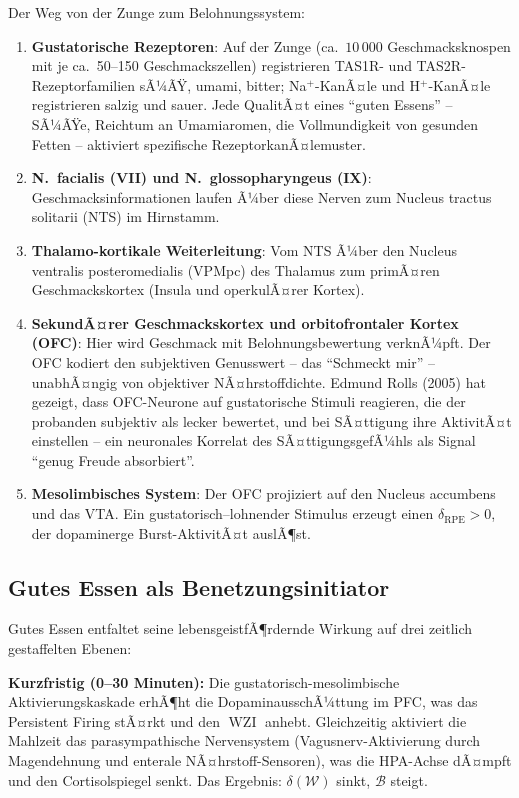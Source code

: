 ﻿\documentclass[12pt,a4paper]{report}
\theoremstyle{plain}
\theoremstyle{definition}
\theoremstyle{remark}
\DeclareMathOperator{\WZI}{WZI}
\begin{document}
	Der Weg von der Zunge zum Belohnungssystem:
	\begin{enumerate}[label=\arabic*., leftmargin=1.8cm]
		\item \textbf{Gustatorische Rezeptoren}: Auf der Zunge (ca.\ $10\,000$
		Geschmacksknospen mit je ca.\ 50--150 Geschmackszellen) registrieren
		TAS1R- und TAS2R-Rezeptor\-familien sÃ¼ÃŸ, umami, bitter;
		Na$^+$-KanÃ¤le und H$^+$-KanÃ¤le registrieren salzig und sauer.
		Jede QualitÃ¤t eines ``guten Essens'' -- SÃ¼ÃŸe, Reichtum an
		Umamiar\-omen, die Vollmundigkeit von gesunden Fetten --
		aktiviert spezifische RezeptorkanÃ¤lemuster.
		\item \textbf{N.\ facialis (VII) und N.\ glossopharyngeus (IX)}:
		Geschmack\-sinformatio\-nen laufen Ã¼ber diese Nerven zum
		Nucleus tractus solitarii (NTS) im Hirnstamm.
		\item \textbf{Thalamo-kortikale Weiterleitung}: Vom NTS Ã¼ber den
		Nucleus ventralis posteromedialis (VPMpc) des Thalamus
		zum primÃ¤ren Geschmackskortex (Insula und operkulÃ¤rer Kortex).
		\item \textbf{SekundÃ¤rer Geschmackskortex und orbitofrontaler Kortex (OFC)}:
		Hier wird Geschmack mit Belohnungsbewertung verknÃ¼pft.
		Der OFC kodiert den subjektiven Genusswert -- das ``Schmeckt mir'' --
		unabhÃ¤ngig von objektiver NÃ¤hrstoffdichte.
		Edmund Rolls (2005) hat gezeigt, dass OFC-Neurone auf
		gustatorische Stimuli reagieren, die der probanden subjektiv
		als lecker bewertet, und bei SÃ¤ttigung ihre AktivitÃ¤t einstellen --
		ein neuronales Korrelat des SÃ¤ttigungsgefÃ¼hls als Signal
		``genug Freude absorbiert''.
		\item \textbf{Mesolimbisches System}: Der OFC projiziert auf den
		Nucleus accumbens und das VTA. Ein gustatorisch--lohnender Stimulus
		erzeugt einen $\delta_{\mathrm{RPE}} > 0$, der dopaminerge
		Burst-AktivitÃ¤t auslÃ¶st.
	\end{enumerate}

	\subsection{Gutes Essen als Benetzungsinitiator}

	Gutes Essen entfaltet seine lebensgeistfÃ¶rdernde Wirkung
	auf drei zeitlich gestaffelten Ebenen:

	\textbf{Kurzfristig (0--30 Minuten):}
	Die gustatorisch-mesolimbische Aktivierungskaskade erhÃ¶ht
	die DopaminausschÃ¼ttung im PFC, was das Persistent Firing stÃ¤rkt
	und den $\WZI$ anhebt. Gleichzeitig aktiviert die Mahlzeit
	das parasympathische Nervensystem (Vagusnerv-Aktivierung durch
	Magendehnung und enterale NÃ¤hrstoff-Sensoren), was die HPA-Achse
	dÃ¤mpft und den Cortisolspiegel senkt. Das Ergebnis:
	$\delta(\mathcal{W})$ sinkt, $\mathcal{B}$ steigt.
\end{document}
